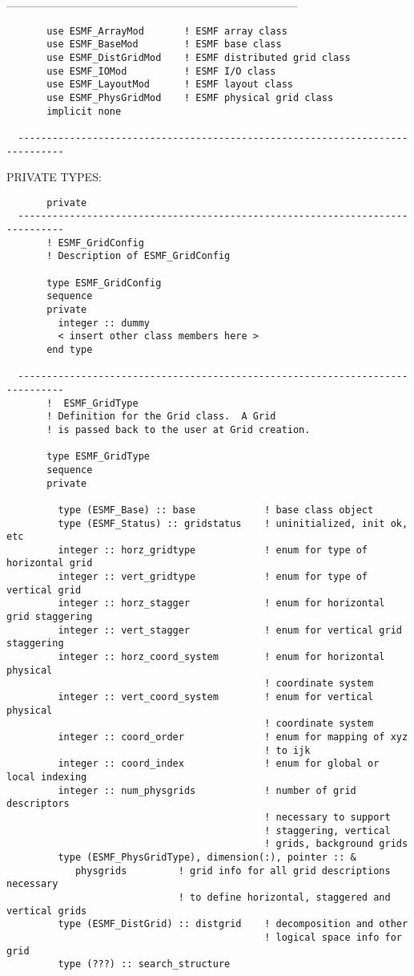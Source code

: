   ------------------------------------------------------------------------------
\begin{verbatim}       use ESMF_ArrayMod       ! ESMF array class
       use ESMF_BaseMod        ! ESMF base class
       use ESMF_DistGridMod    ! ESMF distributed grid class
       use ESMF_IOMod          ! ESMF I/O class
       use ESMF_LayoutMod      ! ESMF layout class
       use ESMF_PhysGridMod    ! ESMF physical grid class
       implicit none
 
  ------------------------------------------------------------------------------\end{verbatim}{\sf PRIVATE TYPES:}
\begin{verbatim}       private
  ------------------------------------------------------------------------------
       ! ESMF_GridConfig
       ! Description of ESMF_GridConfig
 
       type ESMF_GridConfig
       sequence
       private
         integer :: dummy
         < insert other class members here >
       end type
 
  ------------------------------------------------------------------------------
       !  ESMF_GridType
       ! Definition for the Grid class.  A Grid
       ! is passed back to the user at Grid creation.
 
       type ESMF_GridType
       sequence
       private
 
         type (ESMF_Base) :: base            ! base class object
         type (ESMF_Status) :: gridstatus    ! uninitialized, init ok, etc
         integer :: horz_gridtype            ! enum for type of horizontal grid
         integer :: vert_gridtype            ! enum for type of vertical grid
         integer :: horz_stagger             ! enum for horizontal grid staggering
         integer :: vert_stagger             ! enum for vertical grid staggering
         integer :: horz_coord_system        ! enum for horizontal physical
                                             ! coordinate system
         integer :: vert_coord_system        ! enum for vertical physical
                                             ! coordinate system
         integer :: coord_order              ! enum for mapping of xyz 
                                             ! to ijk
         integer :: coord_index              ! enum for global or local indexing
         integer :: num_physgrids            ! number of grid descriptors
                                             ! necessary to support
                                             ! staggering, vertical
                                             ! grids, background grids
         type (ESMF_PhysGridType), dimension(:), pointer :: &
            physgrids         ! grid info for all grid descriptions necessary
                              ! to define horizontal, staggered and vertical grids
         type (ESMF_DistGrid) :: distgrid    ! decomposition and other
                                             ! logical space info for grid
         type (???) :: search_structure
 

\end{verbatim}
